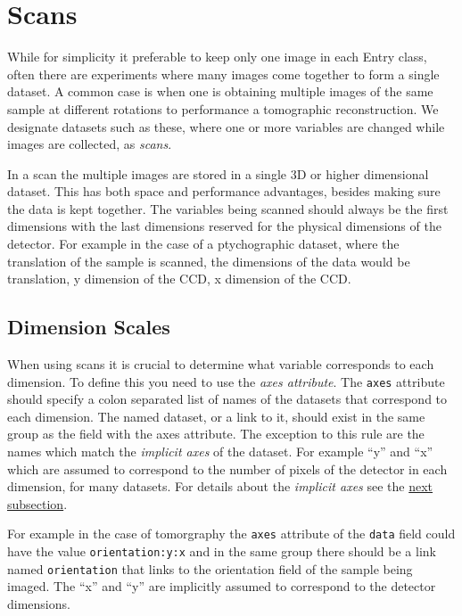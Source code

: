 \documentclass[usletter,11pt]{article}
\begin{document}
\section{Scans}
\label{sec:scans}

While for simplicity it preferable to keep only one image in each Entry
class, often there are experiments where many images come together to
form a single dataset. A common case is when one is obtaining multiple
images of the same sample at different rotations to performance a
tomographic reconstruction. We designate datasets such as these, where one or more
variables are changed while images are collected, as {\em scans}.

In a scan the multiple images are stored in a single 3D or higher
dimensional dataset. This has both space and performance advantages,
besides making sure the data is kept together. The variables being
scanned should always be the first dimensions with the last dimensions
reserved for the physical dimensions of the detector. For example in
the case of a ptychographic dataset, where the translation of the
sample is scanned, the dimensions of the data would be translation, y
dimension of the CCD, x dimension of the CCD.

\subsection{Dimension Scales}
\label{subsec:dimscales}

When using scans it is crucial to determine what variable corresponds
to each dimension. To define this you need to use the {\em  axes
  attribute}. The {\tt axes} attribute should specify a colon separated list
of names of the datasets that correspond to each dimension. The named
dataset, or a link to it, should exist in the same group as the
field with the axes attribute. The exception to this rule are the
names which match the {\em implicit axes} of the dataset. For example
``y'' and ``x'' which are assumed to correspond to the number of
pixels of the detector in each dimension, for many datasets. For
details about the {\em implicit axes} see the \hyperref[subsec:implaxes]{next subsection}.

For example in the case of tomorgraphy the {\tt axes} attribute of the
{\tt data} field could have the value {\tt orientation:y:x} and in
the same group there should be a link named {\tt orientation} that
links to the orientation field of the sample being imaged. The ``x''
and ``y'' are implicitly assumed to correspond to the detector
dimensions.
\end{document}
